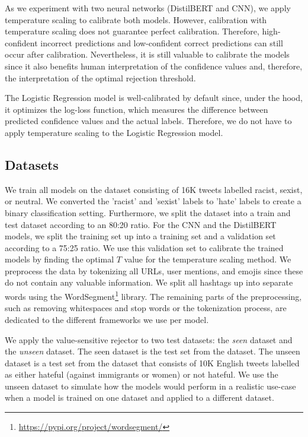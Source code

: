 %
As we experiment with two neural networks (DistilBERT and CNN), we apply temperature scaling to calibrate both models.
%
However, calibration with temperature scaling does not guarantee perfect calibration.
%
Therefore, high-confident incorrect predictions and low-confident correct predictions can still occur after calibration.
%
Nevertheless, it is still valuable to calibrate the models since it also benefits human interpretation of the confidence values and, therefore, the interpretation of the optimal rejection threshold.
%

%
The Logistic Regression model is well-calibrated by default since, under the hood, it optimizes the log-loss function, which measures the difference between predicted confidence values and the actual labels.
%
Therefore, we do not have to apply temperature scaling to the Logistic Regression model.

\subsection{Datasets}
We train all models on the \citet{waseem2016hateful} dataset consisting of 16K tweets labelled racist, sexist, or neutral.
%
We converted the 'racist' and 'sexist' labels to 'hate' labels to create a binary classification setting.
%
Furthermore, we split the dataset into a train and test dataset according to an 80:20 ratio.
%
For the CNN and the DistilBERT models, we split the training set up into a training set and a validation set according to a 75:25 ratio.
%
We use this validation set to calibrate the trained models by finding the optimal $T$ value for the temperature scaling method.
%
We preprocess the data by tokenizing all URLs, user mentions, and emojis since these do not contain any valuable information.
%
We split all hashtags up into separate words using the WordSegment\footnote{\url{https://pypi.org/project/wordsegment/}} library.
%
The remaining parts of the preprocessing, such as removing whitespaces and stop words or the tokenization process, are dedicated to the different frameworks we use per model.
%

%
We apply the value-sensitive rejector to two test datasets: the \emph{seen} dataset and the \textit{unseen} dataset.
%
The seen dataset is the test set from the \citet{waseem2016hateful} dataset.
%
The unseen dataset is a test set from the \citet{basile2019semeval} dataset that consists of 10K English tweets labelled as either hateful (against immigrants or women) or not hateful.
%
We use the unseen dataset to simulate how the models would perform in a realistic use-case when a model is trained on one dataset and applied to a different dataset.
%

